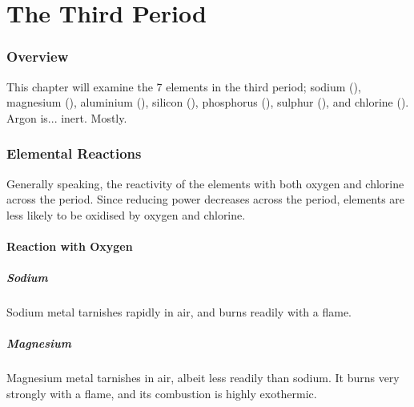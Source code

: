 

\pagebreak
\part{The Third Period}

	\section{Overview}

		This chapter will examine the 7 elements in the third period; sodium (), magnesium (), aluminium (\ch{\Al}), silicon (),
		phosphorus (), sulphur (), and chlorine (\ch{\Cl}). Argon is... inert. Mostly.


	\section{Elemental Reactions}

		Generally speaking, the reactivity of the elements with both oxygen and chlorine  across the period. Since reducing power
		decreases across the period, elements are less likely to be oxidised by oxygen and chlorine.

		\subsection{Reaction with Oxygen}

			\subsubsection{Sodium}

				Sodium metal tarnishes rapidly in air, and burns readily with a  flame.



			\subsubsection{Magnesium}

				Magnesium metal tarnishes in air, albeit less readily than sodium. It burns very strongly with a  flame, and
				its combustion is highly exothermic.

